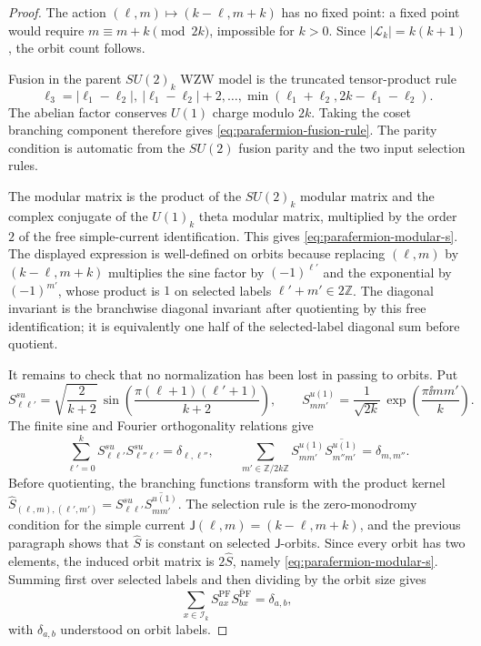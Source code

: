\begin{proof}
The action \((\ell,m)\mapsto(k-\ell,m+k)\) has no fixed point: a fixed
point would require \(m\equiv m+k\pmod {2k}\), impossible for
\(k>0\).  Since \(|\mathcal L_k|=k(k+1)\), the orbit count follows.

Fusion in the parent \(SU(2)_k\) WZW model is the truncated tensor-product
rule
\[
  \ell_3=|\ell_1-\ell_2|,\ |\ell_1-\ell_2|+2,\ldots,
  \min(\ell_1+\ell_2,2k-\ell_1-\ell_2).
\]
The abelian factor conserves \(U(1)\) charge modulo \(2k\).  Taking the
coset branching component therefore gives
\eqref{eq:parafermion-fusion-rule}.  The parity condition is automatic
from the \(SU(2)\) fusion parity and the two input selection rules.

The modular matrix is the product of the \(SU(2)_k\) modular matrix and the
complex conjugate of the \(U(1)_k\) theta modular matrix, multiplied by the
order \(2\) of the free simple-current identification.  This gives
\eqref{eq:parafermion-modular-s}.  The displayed expression is
well-defined on orbits because replacing \((\ell,m)\) by
\((k-\ell,m+k)\) multiplies the sine factor by \((-1)^{\ell'}\) and the
exponential by \((-1)^{m'}\), whose product is \(1\) on selected labels
\(\ell'+m'\in2\mathbb Z\).  The diagonal invariant is the branchwise
diagonal invariant after quotienting by this free identification; it is
equivalently one half of the selected-label diagonal sum before quotient.

It remains to check that no normalization has been lost in passing to
orbits.  Put
\[
  S^{su}_{\ell\ell'}
  =
  \sqrt{\frac2{k+2}}\,
  \sin\!\left(\frac{\pi(\ell+1)(\ell'+1)}{k+2}\right),
  \qquad
  S^{u(1)}_{m m'}
  =
  \frac1{\sqrt{2k}}\,
  \exp\!\left(\frac{\pi\ii mm'}{k}\right).
\]
The finite sine and Fourier orthogonality relations give
\[
  \sum_{\ell'=0}^{k}S^{su}_{\ell\ell'}S^{su}_{\ell''\ell'}
  =\delta_{\ell,\ell''},
  \qquad
  \sum_{m'\in\mathbb Z/2k\mathbb Z}
  S^{u(1)}_{m m'}\overline{S^{u(1)}_{m'' m'}}
  =\delta_{m,m''}.
\]
Before quotienting, the branching functions transform with the product
kernel
\(\widehat S_{(\ell,m),(\ell',m')}
=S^{su}_{\ell\ell'}\overline{S^{u(1)}_{m m'}}\).  The selection rule is the
zero-monodromy condition for the simple current
\(\mathsf J(\ell,m)=(k-\ell,m+k)\), and the previous paragraph shows that
\(\widehat S\) is constant on selected \(\mathsf J\)-orbits.  Since every
orbit has two elements, the induced orbit matrix is \(2\widehat S\), namely
\eqref{eq:parafermion-modular-s}.  Summing first over selected labels and
then dividing by the orbit size gives
\[
  \sum_{x\in\mathcal I_k}
  S^{\operatorname{PF}}_{a x}
  \overline{S^{\operatorname{PF}}_{b x}}
  =
  \delta_{a,b},
\]
with \(\delta_{a,b}\) understood on orbit labels.


\end{proof}
